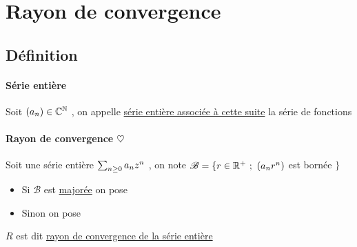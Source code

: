 

\minitoc

\section{Rayon de convergence}
	
	\subsection{Définition}
		
		\vspace{-25pt}
		\traitd
		\paragraph{Série entière}
			Soit $(a_n)\in{\mathbb{C}}^{\mathbb{N}}$ , on appelle \uline{série entière associée à cette suite} la série de fonctions
			\vspace{-5pt}
			\begin{center}
			\end{center}
		\vspace{-10pt}
		\trait
		
		
		\traitd
		\paragraph{Rayon de convergence $\heartsuit$} ${}$ \\
			Soit une série entière $\sum_{n\geq 0} a_nz^n$ , on note $\mathscr{B}=\{r\in{\mathbb{R}}^+ ~;~ (a_nr^n)$ est bornée $\}$
			\begin{itemize}
				\item Si $\mathscr{B}$ est \uline{majorée} on pose 
				\item Sinon on pose 
			\end{itemize}
			$R$ est dit \uline{rayon de convergence de la série entière}
		\trait
		
		
